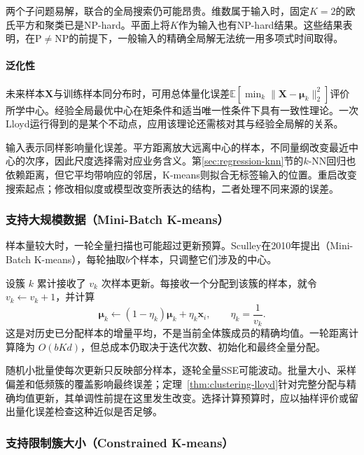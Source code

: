 两个子问题易解，联合的全局搜索仍可能昂贵。维数属于输入时，固定$K=2$的欧氏平方和聚类已是NP-hard。平面上将$K$作为输入也有NP-hard结果。这些结果表明，在$\mathrm{P}\ne\mathrm{NP}$的前提下，一般输入的精确全局解无法统一用多项式时间取得。

\paragraph{泛化性}
未来样本$\bm{X}$与训练样本同分布时，可用总体量化误差$\mathbb{E}[\min_k\lVert\bm{X}-\bm{\mu}_k\rVert_2^2]$评价所学中心。经验全局最优中心在矩条件和适当唯一性条件下具有一致性理论。一次Lloyd运行得到的是某个不动点，应用该理论还需核对其与经验全局解的关系。

输入表示同样影响量化误差。平方距离放大远离中心的样本，不同量纲改变最近中心的次序，因此尺度选择需对应业务含义。第\ref{sec:regression-knn}节的$k$-NN回归也依赖距离，但它平均带响应的邻居，K-means则拟合无标签输入的位置。重启改变搜索起点；修改相似度或模型改变所表达的结构，二者处理不同来源的误差。

\subsubsection{支持大规模数据（Mini-Batch K-means）}

样本量较大时，一轮全量扫描也可能超过更新预算。Sculley在2010年提出（Mini-Batch K-means），每轮抽取$b$个样本，只调整它们涉及的中心。

设簇 $k$ 累计接收了 $v_k$ 次样本更新。每接收一个分配到该簇的样本，就令 $v_k\leftarrow v_k+1$，并计算
\begin{equation}
 \bm{\mu}_k\leftarrow
 (1-\eta_k)\bm{\mu}_k+\eta_k\bm{x}_i,
 \qquad \eta_k=\frac{1}{v_k}.
 \label{eq:clustering-minibatch}
\end{equation}
这是对历史已分配样本的增量平均，不是当前全体簇成员的精确均值。一轮距离计算降为 $O(bKd)$，但总成本仍取决于迭代次数、初始化和最终全量分配。

随机小批量使每次更新只反映部分样本，逐轮全量SSE可能波动。批量大小、采样偏差和低频簇的覆盖影响最终误差；定理~\ref{thm:clustering-lloyd}针对完整分配与精确均值更新，其单调性前提在这里发生改变。选择计算预算时，应以抽样评价或留出量化误差检查这种近似是否足够。

\subsubsection{支持限制簇大小（Constrained K-means）}
\label{sec:clustering-capacity}

